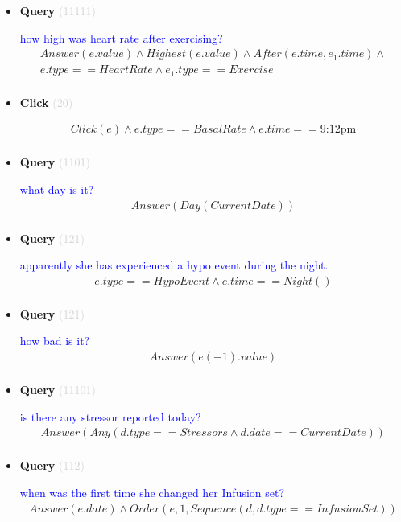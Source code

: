 \documentclass[11pt]{article}
\newcommand{\key}[1]{\textcolor{lightgray}{#1}}
\newcounter{CQuery}
\newcounter{CClick}
\begin{document}
\begin{itemize}
\item
\textbf{Query\theCQuery} \key{(11111)} \addtocounter{CQuery}{1}
\textcolor{blue}{ how high was heart rate after exercising? }
\begin{multline*}
Answer(e.value) \wedge Highest(e.value) \wedge After(e.time, e_1.time) \wedge \\ 
e.type==HeartRate \wedge e_1.type==Exercise \\ 
\end{multline*}


\item
\textbf{Click\theCClick} \key{(20)} \addtocounter{CClick}{1}
\textcolor{blue}{  }
\begin{multline*}
Click(e) \wedge e.type==BasalRate \wedge e.time==\mbox{9:12pm} \\ 
\end{multline*}


\item
\textbf{Query\theCQuery} \key{(1101)} \addtocounter{CQuery}{1}
\textcolor{blue}{ what day is it? }
\begin{multline*}
Answer(Day(CurrentDate)) \\ 
\end{multline*}


\item
\textbf{Query\theCQuery} \key{(121)} \addtocounter{CQuery}{1}
\textcolor{blue}{ apparently she has experienced a hypo event during the night. }
\begin{multline*}
e.type==HypoEvent \wedge e.time==Night() \\ 
\end{multline*}


\item
\textbf{Query\theCQuery} \key{(121)} \addtocounter{CQuery}{1}
\textcolor{blue}{ how bad is it? }
\begin{multline*}
Answer(e(-1).value) \\ 
\end{multline*}


\item
\textbf{Query\theCQuery} \key{(11101)} \addtocounter{CQuery}{1}
\textcolor{blue}{ is there any stressor reported today? }
\begin{multline*}
Answer(Any(d.type==Stressors \wedge d.date==CurrentDate)) \\ 
\end{multline*}


\item
\textbf{Query\theCQuery} \key{(112)} \addtocounter{CQuery}{1}
\textcolor{blue}{ when was the first time she changed her Infusion set? }
\begin{multline*}
Answer(e.date) \wedge Order(e, 1, Sequence(d, d.type==InfusionSet)) \\ 
\end{multline*}



\end{itemize}
\end{document}
